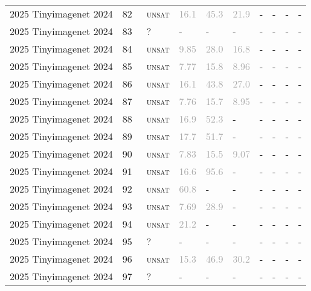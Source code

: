 \begin{center}
{\begin{longtable}{@{}llllllllll@{}}
2025 Tinyimagenet 2024 & 82 & ~\textsc{unsat} & \textcolor{darkgray}{16.1} & \textcolor{darkgray}{45.3} & \textcolor{darkgray}{21.9} & - & - & - & - \\
2025 Tinyimagenet 2024 & 83 & ~? & - & - & - & - & - & - & - \\
2025 Tinyimagenet 2024 & 84 & ~\textsc{unsat} & \textcolor{darkgray}{9.85} & \textcolor{darkgray}{28.0} & \textcolor{darkgray}{16.8} & - & - & - & - \\
2025 Tinyimagenet 2024 & 85 & ~\textsc{unsat} & \textcolor{darkgray}{7.77} & \textcolor{darkgray}{15.8} & \textcolor{darkgray}{8.96} & - & - & - & - \\
2025 Tinyimagenet 2024 & 86 & ~\textsc{unsat} & \textcolor{darkgray}{16.1} & \textcolor{darkgray}{43.8} & \textcolor{darkgray}{27.0} & - & - & - & - \\
2025 Tinyimagenet 2024 & 87 & ~\textsc{unsat} & \textcolor{darkgray}{7.76} & \textcolor{darkgray}{15.7} & \textcolor{darkgray}{8.95} & - & - & - & - \\
2025 Tinyimagenet 2024 & 88 & ~\textsc{unsat} & \textcolor{darkgray}{16.9} & \textcolor{darkgray}{52.3} & - & - & - & - & - \\
2025 Tinyimagenet 2024 & 89 & ~\textsc{unsat} & \textcolor{darkgray}{17.7} & \textcolor{darkgray}{51.7} & - & - & - & - & - \\
2025 Tinyimagenet 2024 & 90 & ~\textsc{unsat} & \textcolor{darkgray}{7.83} & \textcolor{darkgray}{15.5} & \textcolor{darkgray}{9.07} & - & - & - & - \\
2025 Tinyimagenet 2024 & 91 & ~\textsc{unsat} & \textcolor{darkgray}{16.6} & \textcolor{darkgray}{95.6} & - & - & - & - & - \\
2025 Tinyimagenet 2024 & 92 & ~\textsc{unsat} & \textcolor{darkgray}{60.8} & - & - & - & - & - & - \\
2025 Tinyimagenet 2024 & 93 & ~\textsc{unsat} & \textcolor{darkgray}{7.69} & \textcolor{darkgray}{28.9} & - & - & - & - & - \\
2025 Tinyimagenet 2024 & 94 & ~\textsc{unsat} & \textcolor{darkgray}{21.2} & - & - & - & - & - & - \\
2025 Tinyimagenet 2024 & 95 & ~? & - & - & - & - & - & - & - \\
2025 Tinyimagenet 2024 & 96 & ~\textsc{unsat} & \textcolor{darkgray}{15.3} & \textcolor{darkgray}{46.9} & \textcolor{darkgray}{30.2} & - & - & - & - \\
2025 Tinyimagenet 2024 & 97 & ~? & - & - & - & - & - & - & - \\

\end{longtable}}
\end{center}
